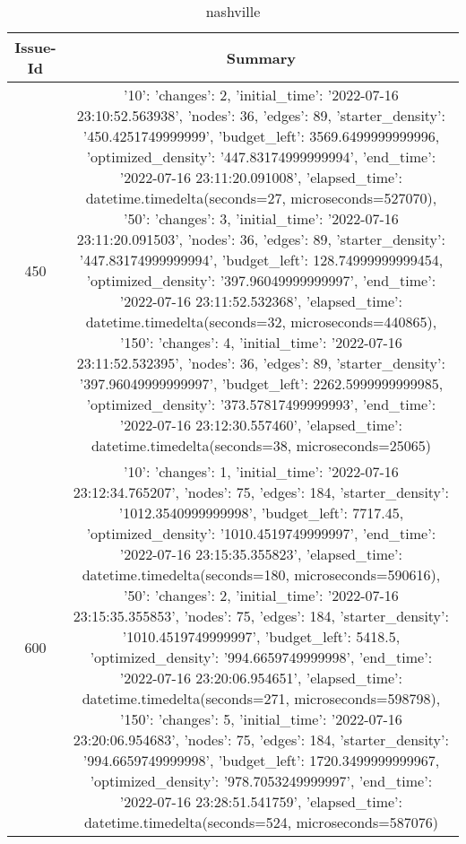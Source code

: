 \begin{table}[ht]
\caption{nashville}
\centering
\begin{tabular}{@{}c c@{}}
	\toprule
	{\bfseries Issue-Id} & {\bfseries Summary} \\
	\midrule
	450 & {'10': {'changes': 2, 'initial_time': '2022-07-16 23:10:52.563938', 'nodes': 36, 'edges': 89, 'starter_density': '450.4251749999999', 'budget_left': 3569.6499999999996, 'optimized_density': '447.83174999999994', 'end_time': '2022-07-16 23:11:20.091008', 'elapsed_time': datetime.timedelta(seconds=27, microseconds=527070)}, '50': {'changes': 3, 'initial_time': '2022-07-16 23:11:20.091503', 'nodes': 36, 'edges': 89, 'starter_density': '447.83174999999994', 'budget_left': 128.74999999999454, 'optimized_density': '397.96049999999997', 'end_time': '2022-07-16 23:11:52.532368', 'elapsed_time': datetime.timedelta(seconds=32, microseconds=440865)}, '150': {'changes': 4, 'initial_time': '2022-07-16 23:11:52.532395', 'nodes': 36, 'edges': 89, 'starter_density': '397.96049999999997', 'budget_left': 2262.5999999999985, 'optimized_density': '373.57817499999993', 'end_time': '2022-07-16 23:12:30.557460', 'elapsed_time': datetime.timedelta(seconds=38, microseconds=25065)}}\\ 
	600 & {'10': {'changes': 1, 'initial_time': '2022-07-16 23:12:34.765207', 'nodes': 75, 'edges': 184, 'starter_density': '1012.3540999999998', 'budget_left': 7717.45, 'optimized_density': '1010.4519749999997', 'end_time': '2022-07-16 23:15:35.355823', 'elapsed_time': datetime.timedelta(seconds=180, microseconds=590616)}, '50': {'changes': 2, 'initial_time': '2022-07-16 23:15:35.355853', 'nodes': 75, 'edges': 184, 'starter_density': '1010.4519749999997', 'budget_left': 5418.5, 'optimized_density': '994.6659749999998', 'end_time': '2022-07-16 23:20:06.954651', 'elapsed_time': datetime.timedelta(seconds=271, microseconds=598798)}, '150': {'changes': 5, 'initial_time': '2022-07-16 23:20:06.954683', 'nodes': 75, 'edges': 184, 'starter_density': '994.6659749999998', 'budget_left': 1720.3499999999967, 'optimized_density': '978.7053249999997', 'end_time': '2022-07-16 23:28:51.541759', 'elapsed_time': datetime.timedelta(seconds=524, microseconds=587076)}}\\
	\bottomrule
\end{tabular}
\label{table:nonlin}
\end{table}

